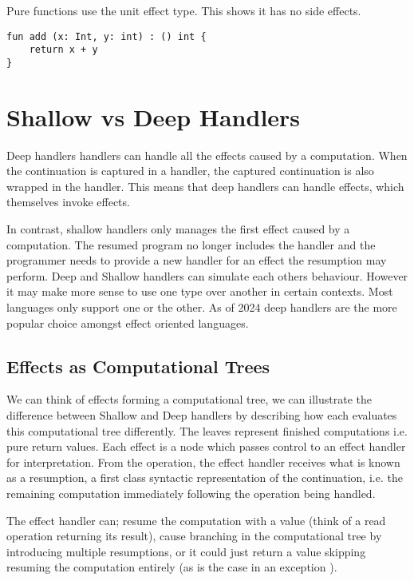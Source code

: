 \documentclass[logo,bsc,singlespacing,parskip]{infthesis}
\begin{document}
Pure functions use the unit effect type. This shows it has no side effects. 

\begin{lstlisting}
fun add (x: Int, y: int) : () int {
	return x + y
}
\end{lstlisting}

\section{Shallow vs Deep Handlers}

Deep handlers \cite{hillerstrom_foundations_nodate} handlers can handle all the effects caused by a computation. When the continuation is captured in a handler, the captured continuation is also wrapped in the handler. This means that deep handlers can handle effects, which themselves invoke effects. 

In contrast, shallow handlers \cite{ryu_shallow_2018} only manages the first effect caused by a computation. The resumed program no longer includes the handler and the programmer needs to provide a new handler for an effect the resumption may perform.
Deep and Shallow handlers can simulate each others behaviour. However it may make more sense to use one type over another in certain contexts. Most languages only support one or the other. As of 2024 deep handlers are the more popular choice amongst effect oriented languages.

\subsection{Effects as Computational Trees}

We can think of effects forming a computational tree, we can illustrate the difference between Shallow and Deep handlers by describing how each evaluates this computational tree differently. The leaves represent finished computations i.e. pure return values. Each effect is a node which passes control to an effect handler for interpretation. From the operation, the effect handler receives what is known as a resumption, a first class syntactic representation of the continuation, i.e. the remaining computation immediately following the operation being handled. 

The effect handler can; resume the computation with a value (think of a read operation returning its result), cause branching in the computational tree by introducing multiple resumptions, or it could just return a value skipping resuming the computation entirely (as is the case in an exception ). 
\end{document}
